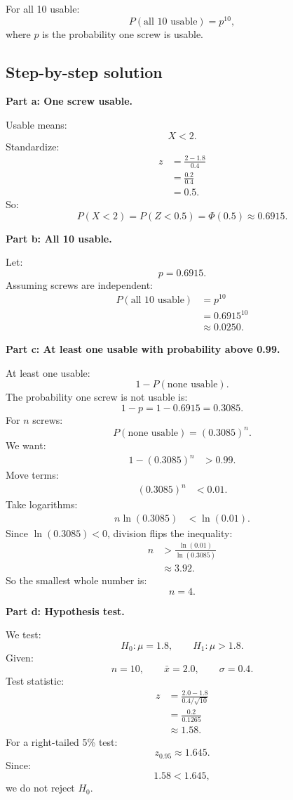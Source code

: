 \documentclass[11pt,a4paper]{article}
\begin{document}
For all 10 usable:
\[
P(\text{all 10 usable})=p^{10},
\]
where \(p\) is the probability one screw is usable.

\subsection*{Step-by-step solution}
\textbf{Part a: One screw usable.}

Usable means:
\[
X<2.
\]
Standardize:
\begin{align*}
z
&=\frac{2-1.8}{0.4}\\
&=\frac{0.2}{0.4}\\
&=0.5.
\end{align*}
So:
\[
P(X<2)=P(Z<0.5)=\Phi(0.5)\approx 0.6915.
\]

\textbf{Part b: All 10 usable.}

Let:
\[
p=0.6915.
\]
Assuming screws are independent:
\begin{align*}
P(\text{all 10 usable})
&=p^{10}\\
&=0.6915^{10}\\
&\approx 0.0250.
\end{align*}

\textbf{Part c: At least one usable with probability above 0.99.}

At least one usable:
\[
1-P(\text{none usable}).
\]
The probability one screw is not usable is:
\[
1-p=1-0.6915=0.3085.
\]
For \(n\) screws:
\[
P(\text{none usable})=(0.3085)^n.
\]
We want:
\begin{align*}
1-(0.3085)^n&>0.99.
\end{align*}
Move terms:
\begin{align*}
(0.3085)^n&<0.01.
\end{align*}
Take logarithms:
\begin{align*}
n\ln(0.3085)&<\ln(0.01).
\end{align*}
Since \(\ln(0.3085)<0\), division flips the inequality:
\begin{align*}
n&>\frac{\ln(0.01)}{\ln(0.3085)}\\
&\approx 3.92.
\end{align*}
So the smallest whole number is:
\[
n=4.
\]

\textbf{Part d: Hypothesis test.}

We test:
\[
H_0:\mu=1.8,\qquad H_1:\mu>1.8.
\]
Given:
\[
n=10,\qquad \bar{x}=2.0,\qquad \sigma=0.4.
\]
Test statistic:
\begin{align*}
z
&=\frac{2.0-1.8}{0.4/\sqrt{10}}\\
&=\frac{0.2}{0.1265}\\
&\approx 1.58.
\end{align*}
For a right-tailed 5\% test:
\[
z_{0.95}\approx 1.645.
\]
Since:
\[
1.58<1.645,
\]
we do not reject \(H_0\).
\end{document}
